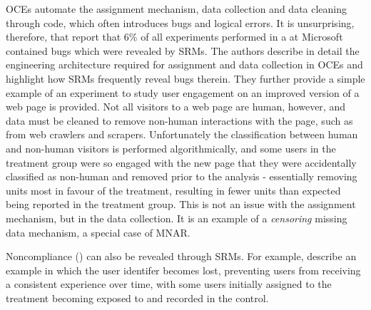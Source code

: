 \documentclass[11pt]{article}
\begin{document}
OCEs automate the assignment mechanism, data collection and data cleaning through code, which often introduces bugs and logical errors.
It is unsurprising, therefore, that \cite{fabijan} report that 6\% of all experiments performed in a at Microsoft contained bugs which were revealed by SRMs.
The authors describe in detail the engineering architecture required for assignment and data collection in OCEs and highlight how SRMs frequently reveal bugs therein.
They further provide a simple example of an experiment to study user engagement on an improved version of a web page is provided.
Not all visitors to a web page are human, however, and data must be cleaned to remove non-human interactions with the page, such as from web crawlers and scrapers.
Unfortunately the classification between human and non-human visitors is performed algorithmically, and some users in the treatment group were so engaged with the new page that they were accidentally classified as non-human and removed prior to the analysis - essentially removing units most in favour of the treatment, resulting in fewer units than expected being reported in the treatment group.
This is not an issue with the assignment mechanism, but in the data collection.
It is an example of a \textit{censoring} missing data mechanism, a special case of MNAR.

Noncompliance (\cite{imbens}) can also be revealed through SRMs. For example, \cite{zhao} describe an example in which the user identifer becomes lost, preventing users from receiving a consistent experience over time, with some users initially assigned to the treatment becoming exposed to and recorded in the control.
\end{document}
